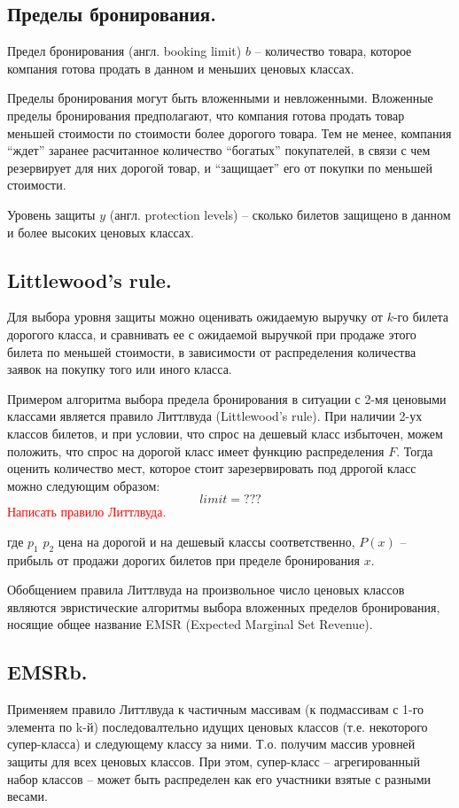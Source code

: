 \documentclass[12pt, reqno]{article}
\theoremstyle{definition}
\theoremstyle{definition}
\theoremstyle{definition}
\theoremstyle{definition}
\theoremstyle{definition}
\theoremstyle{definition}
\theoremstyle{definition}
\theoremstyle{definition}
\theoremstyle{definition}
\begin{document}
		
		\subsection{Пределы бронирования.}
				
		Предел бронирования (англ. booking limit) $b$ -- количество товара, которое компания готова продать в данном и меньших ценовых классах.
	
		Пределы бронирования могут быть вложенными и невложенными. Вложенные пределы бронирования предполагают, что компания готова продать товар меньшей стоимости по стоимости более дорогого товара. Тем не менее, компания ``ждет'' заранее расчитанное количество ``богатых'' покупателей, в связи с чем резервирует для них дорогой товар, и ``защищает'' его от покупки по меньшей стоимости.
		
		Уровень защиты $y$ (англ. protection levels) -- сколько билетов защищено в данном и более высоких ценовых классах.
		
		\subsection{Littlewood's rule.}
		
		Для выбора уровня защиты можно оценивать ожидаемую выручку от $k$-го билета дорогого класса, и сравнивать ее с ожидаемой выручкой при продаже этого билета по меньшей стоимости, в зависимости от распределения количества заявок на покупку того или иного класса.
		
		Примером алгоритма выбора предела бронирования в ситуации с 2-мя ценовыми классами является правило Литтлвуда (Littlewood's rule). При наличии 2-ух классов билетов, и при условии, что спрос на дешевый класс избыточен, можем положить, что спрос на дорогой класс имеет функцию распределения ${F}$. Тогда оценить количество мест, которое стоит зарезервировать под дррогой класс можно следующим образом:
		$$limit = ???$$
		\textcolor{red}{Написать правило Литтлвуда.}
		
		где $p_1$ $p_2$ цена на дорогой и на дешевый классы соответственно, $P(x)$ -- прибыль от продажи дорогих билетов при пределе бронирования $x$.
		
		Обобщением правила Литтлвуда на произвольное число ценовых классов являются эвристические алгоритмы выбора вложенных пределов бронирования, носящие общее название EMSR (Expected Marginal Set Revenue).
		
		
		\subsection{EMSRb.}		
		Применяем правило Литтлвуда к частичным массивам (к подмассивам с 1-го элемента по k-й) последовалтельно идущих ценовых классов (т.е. некоторого супер-класса) и следующему классу за ними. Т.о. получим массив уровней защиты для всех ценовых классов. При этом, супер-класс -- агрегированный набор классов -- может быть распределен как его участники взятые с разными весами.	
		
\end{document}
